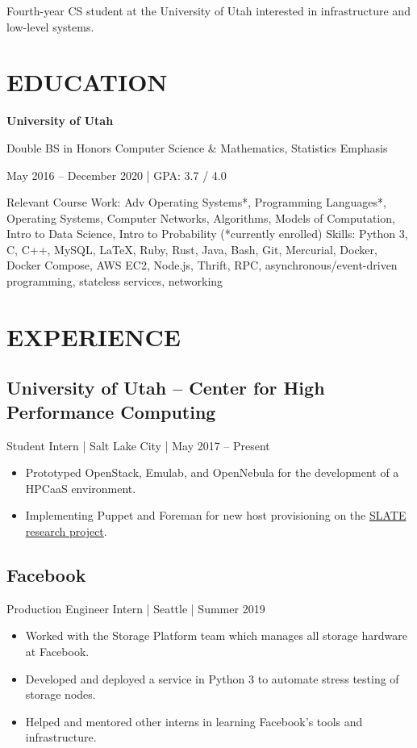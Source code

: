 \documentclass[10pt, letterpaper]{resume}
\begin{document}
\maketitle

{\centering
  Fourth-year CS student at the University of Utah interested in infrastructure and low-level systems.
  \par
}

\section{EDUCATION}
{\centering
  \textbf{University of Utah}

  Double BS in Honors Computer Science \& Mathematics, Statistics Emphasis

  May 2016 -- December 2020 | GPA: 3.7 / 4.0
  \par
}
\vspace{10pt}
{{\selectfont Relevant Course Work:}
Adv Operating Systems*, Programming Languages*, Operating Systems, Computer Networks, Algorithms, Models of Computation, Intro to Data Science, Intro to Probability {\footnotesize(*currently enrolled)}}
\smallbreak
{{\selectfont Skills:} Python 3, C, C++, MySQL, \LaTeX, Ruby, Rust, Java, Bash, Git, Mercurial, Docker, Docker Compose, AWS EC2, Node.js, Thrift, RPC, asynchronous/event-driven programming, stateless services, networking}

\section{EXPERIENCE}
\subsection{University of Utah -- Center for High Performance Computing}
Student Intern | Salt Lake City | May 2017 -- Present
\begin{itemize}
  \item Prototyped OpenStack, Emulab, and OpenNebula for the development of a HPCaaS environment.
  \item Implementing Puppet and Foreman for new host provisioning on the \href{https://slateci.io}{SLATE research project}.
\end{itemize}

\subsection{Facebook}
Production Engineer Intern | Seattle | Summer 2019
\begin{itemize}
  \item Worked with the Storage Platform team which manages all storage hardware at Facebook.
  \item Developed and deployed a service in Python 3 to automate stress testing of storage nodes.
  \item Helped and mentored other interns in learning Facebook's tools and infrastructure.
\end{itemize}
\end{document}

